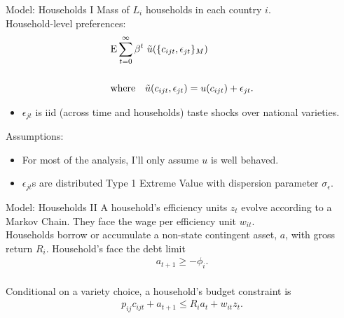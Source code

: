 \documentclass[9pt,pdftex,aspectratio=1610]{beamer}
\theoremstyle{definition}
\begin{document}

\begin{frame}[t]{Model: Households I}
\smallskip
Mass of $L_i$ households in each country $i$.\\
\medskip
Household-level preferences:
\begin{align*}
\small
&  \mathrm{E}\sum_{t = 0}^{\infty} \beta^{t} \ \tilde{u}( \{ c_{ijt}, \epsilon_{jt} \}_{M})\\
\\
& \mbox{where}  \ \ \  \tilde{u}( c_{ijt}, \epsilon_{jt} ) =  u(c_{ijt}) + \epsilon_{jt}.
\end{align*}
\begin{itemize}
\item $\epsilon_{jt}$ is iid (across time and households) taste shocks over national varieties.
\end{itemize}
\medskip
Assumptions:
\begin{itemize}
\smallskip
\item For most of the analysis, I'll only assume $u$ is well behaved.
\smallskip
\item $\epsilon_{jt}$s are distributed Type 1 Extreme Value with dispersion parameter $\sigma_{\epsilon}$.
\end{itemize}
\end{frame}


\begin{frame}[t]{Model: Households II}
\smallskip
A household's efficiency units $z_t$ evolve according to a Markov Chain. They face the wage per efficiency unit $w_{it}$.\\
\bigskip
\medskip
Households borrow or accumulate a non-state contingent asset, $a$, with gross return $R_{i}$. Household's face the debt limit
\begin{align*}
a_{t+1} \geq - \phi_{i}.
\end{align*}\\
\bigskip
\medskip
Conditional on a variety choice, a household's budget constraint is
\begin{align*}
p_{ij}c_{ijt} +  a_{t+1} \leq    R_{i} a_{t} + w_{it} z_{t}.
\end{align*}
\end{frame}
\end{document}
